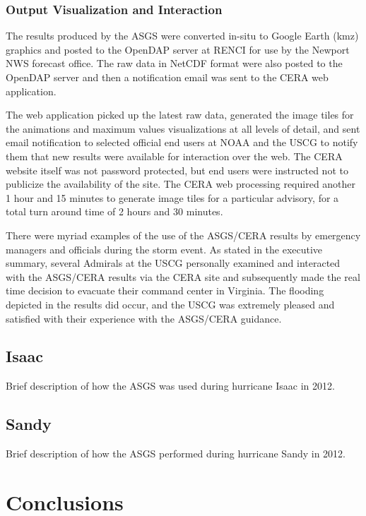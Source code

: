\documentclass[12pt]{article}
\begin{document}
\subsubsection{Output Visualization and Interaction}

The results produced by the ASGS were converted in-situ to Google 
Earth (kmz) graphics and posted to the OpenDAP server at RENCI for 
use by the Newport NWS forecast office. The raw data in NetCDF 
format were also posted to the OpenDAP server and then a 
notification email was sent to the CERA web application. 

The web application picked up the latest raw data, generated the 
image tiles for the animations and maximum values visualizations at 
all levels of detail, and sent email notification to selected 
official end users at NOAA and the USCG to notify them that new 
results were available for interaction over the web. The CERA 
website itself was not password protected, but end users were 
instructed not to publicize the availability of the site. The CERA 
web processing required another 1 hour and 15 minutes to generate 
image tiles for a particular advisory, for a total turn around time 
of 2 hours and 30 minutes.

There were myriad examples of the use of the ASGS/CERA results by 
emergency managers and officials during the storm event. As stated 
in the executive summary, several Admirals at the USCG personally 
examined and interacted with the ASGS/CERA results via the CERA site 
and subsequently made the real time decision to evacuate their 
command center in Virginia. The flooding depicted in the results did 
occur, and the USCG was extremely pleased and satisfied with their 
experience with the ASGS/CERA guidance.

\subsection{Isaac}

Brief description of how the ASGS was used during hurricane Isaac in 2012.

\subsection{Sandy}

Brief description of how the ASGS performed during hurricane Sandy in 2012.

\section{Conclusions}
\end{document}
